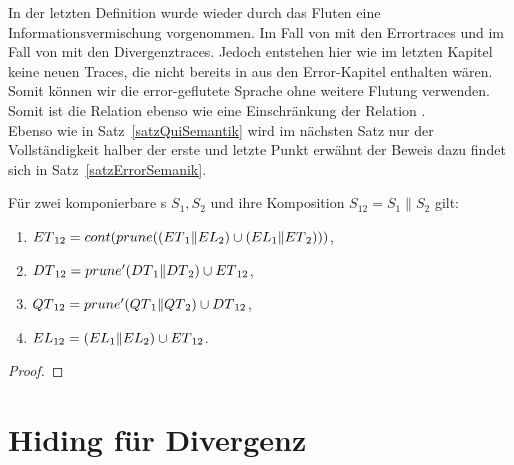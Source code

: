 In der letzten Definition wurde wieder durch das Fluten eine
Informationsvermischung vorgenommen. Im Fall von \DT{} mit den Errortraces und
im Fall von \QT{} mit den Divergenztraces. Jedoch entstehen hier wie im letzten
Kapitel keine neuen Traces, die nicht bereits in \EL{} aus den Error-Kapitel
enthalten wären. Somit können wir die error-geflutete Sprache ohne weitere
Flutung verwenden. Somit ist die Relation \DRel{} ebenso wie \QRel{} eine
Einschränkung der Relation \ERel{}.\\
Ebenso wie in Satz~\ref{satzQuiSemantik} wird im nächsten Satz nur der
Vollständigkeit halber der erste und letzte Punkt erwähnt der Beweis dazu
findet sich in Satz~\ref{satzErrorSemanik}.

\begin{satz}
  Für zwei komponierbare \EIO{}s $S_1, S_2$ und ihre Komposition
  $S_{12}=S_1\|S_2$ gilt:
  \begin{enumerate}
    \item $ET{}_{12}=cont (prune ((ET{}_1\|EL{}_2)\cup
      (EL{}_1\|ET{}_2)))$,
    \item $DT{}_{12}=prune' (DT{}_1\|DT{}_2)\cup ET{}_{12}$,
    \item $QT{}_{12}=prune' (QT{}_1\|QT{}_2)\cup DT{}_{12}$,
    \item $EL{}_{12}=(EL{}_1\|EL{}_2)\cup ET{}_{12}$.
  \end{enumerate}
\end{satz}

\begin{proof}
  
\end{proof}

\section{Hiding für Divergenz}
